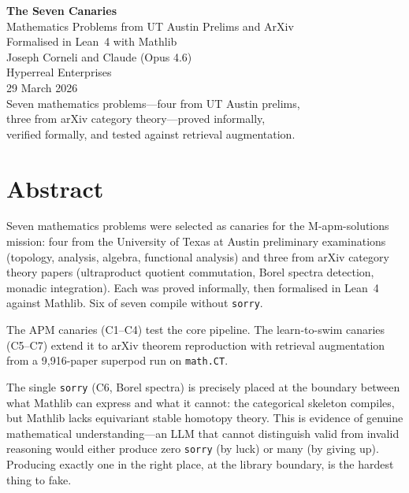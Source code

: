 \documentclass[12pt,oneside]{book}
\theoremstyle{plain}
\theoremstyle{definition}
\theoremstyle{remark}
\begin{document}
\begin{titlepage}
\vspace*{3cm}
\begin{center}
{\Huge\bfseries The Seven Canaries}\\[0.8cm]
{\Large Mathematics Problems from UT Austin Prelims and ArXiv\\Formalised in Lean~4 with Mathlib}\\[2cm]
{\large Joseph Corneli \quad and \quad Claude (Opus 4.6)}\\[0.5cm]
{\normalsize Hyperreal Enterprises}\\[2cm]
{\normalsize 29 March 2026}\\[3cm]
{\small Seven mathematics problems---four from UT Austin prelims,\\
three from arXiv category theory---proved informally,\\
verified formally, and tested against retrieval augmentation.}
\end{center}
\end{titlepage}

\tableofcontents

\chapter*{Abstract}

Seven mathematics problems were selected as canaries for the
M-apm-solutions mission: four from the University of Texas at Austin
preliminary examinations (topology, analysis, algebra, functional
analysis) and three from arXiv category theory papers (ultraproduct
quotient commutation, Borel spectra detection, monadic integration).
Each was proved informally, then formalised in Lean~4 against Mathlib.
Six of seven compile without \texttt{sorry}.

The APM canaries (C1--C4) test the core pipeline. The learn-to-swim
canaries (C5--C7) extend it to arXiv theorem reproduction with
retrieval augmentation from a 9{,}916-paper superpod run on
\texttt{math.CT}.

The single \texttt{sorry} (C6, Borel spectra) is precisely placed at
the boundary between what Mathlib can express and what it cannot: the
categorical skeleton compiles, but Mathlib lacks equivariant stable
homotopy theory. This is evidence of genuine mathematical
understanding---an LLM that cannot distinguish valid from invalid
reasoning would either produce zero \texttt{sorry} (by luck) or many
(by giving up). Producing exactly one in the right place, at the
library boundary, is the hardest thing to fake.
\end{document}
